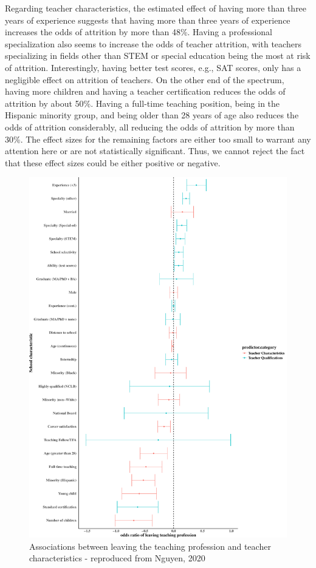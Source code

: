 \documentclass[
]{article}
\begin{document}
Regarding teacher characteristics, the estimated effect of having more than three years of experience suggests that having more than three years of experience increases the odds of attrition by more than 48\%. Having a professional specialization also seems to increase the odds of teacher attrition, with teachers specializing in fields other than STEM or special education being the most at risk of attrition. Interestingly, having better test scores, e.g., SAT scores, only has a negligible effect on attrition of teachers. On the other end of the spectrum, having more children and having a teacher certification reduces the odds of attrition by about 50\%. Having a full-time teaching position, being in the Hispanic minority group, and being older than 28 years of age also reduces the odds of attrition considerably, all reducing the odds of attrition by more than 30\%. The effect sizes for the remaining factors are either too small to warrant any attention here or are not statistically significant. Thus, we cannot reject the fact that these effect sizes could be either positive or negative.

\begin{figure}[H]
\includegraphics[width=1\linewidth,]{In-it-for-the-long-run_kollekolle_files/figure-latex/compare-effs-teacher-chars-1} \caption{Associations between leaving the teaching profession and teacher characteristics - reproduced from Nguyen, 2020}\label{fig:compare-effs-teacher-chars}
\end{figure}
\end{document}

